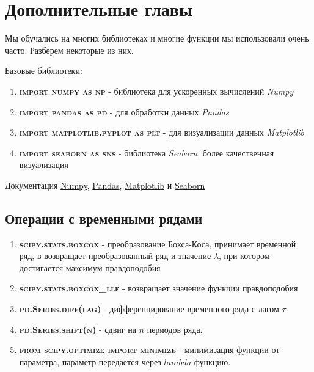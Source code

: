 \documentclass[aps,%
12pt,%
final,%
oneside,
onecolumn,%
musixtex, %
superscriptaddress,%
centertags]{article} %
\theoremstyle{plain}
\theoremstyle{definition}
\theoremstyle{remark}
\begin{document}
\newpage
\section{Дополнительные главы}

Мы обучались на многих библиотеках и многие функции мы использовали очень часто. Разберем некоторые из них.

Базовые библиотеки:

\begin{enumerate}
	\item \textbf{\textsc{import numpy as np}} - библиотека для ускоренных вычислений \textit{Numpy}
	\item \textbf{\textsc{import pandas as pd}} - для обработки данных \textit{Pandas}
	\item \textbf{\textsc{import matplotlib.pyplot as plt}} - для визуализации данных \textit{Matplotlib} 
	\item \textbf{\textsc{import seaborn as sns}} - библиотека \textit{Seaborn}, более качественная визуализация
\end{enumerate}

Документация \href{https://numpy.org/doc/stable/reference/}{Numpy}, 
\href{https://pandas.pydata.org/docs/}{Pandas}, 
\href{https://matplotlib.org/3.2.1/contents.html}{Matplotlib} и 
\href{https://seaborn.pydata.org/}{Seaborn}

\newpage
\subsection{Операции с временными рядами}

\begin{enumerate}
	\item \textbf{\textsc{scipy.stats.boxcox}} - преобразование Бокса-Коса, принимает временной ряд, в возвращает преобразованный ряд и значение $\lambda$, при котором достигается максимум правдоподобия
	\item \textbf{\textsc{scipy.stats.boxcox\_llf}} - возвращает значение функции правдоподобия
	\item \textbf{\textsc{pd.Series.diff(lag)}} - дифференцирование временного ряда с лагом $\tau$
	\item \textbf{\textsc{pd.Series.shift(n)}} - сдвиг на $n$ периодов ряда.
	\item \textbf{\textsc{from scipy.optimize import minimize}} - минимизация функции от параметра, параметр передается через $lambda$-функцию. 
\end{enumerate}
\end{document}
